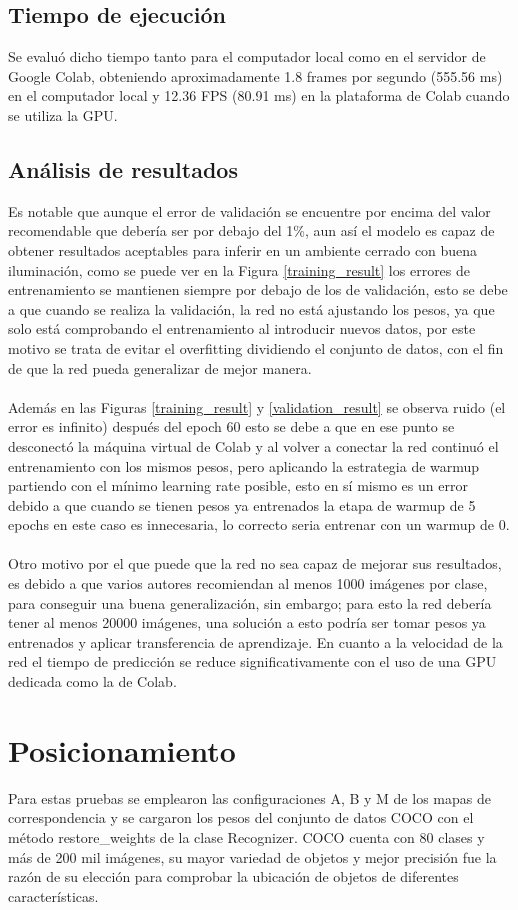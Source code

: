 \subsection{Tiempo de ejecución}
Se evaluó dicho tiempo tanto para el computador local como en el servidor de Google Colab, obteniendo aproximadamente 1.8 frames por segundo (555.56 ms) en el computador local y 12.36 FPS (80.91 ms) en la plataforma de Colab cuando se utiliza la GPU.
\subsection{Análisis de resultados}
Es notable que aunque el error de validación se encuentre por encima del valor recomendable que debería ser por debajo del 1\%, aun así el modelo es capaz de obtener resultados aceptables para inferir en un ambiente cerrado con buena iluminación, como se puede ver en la Figura \ref{training_result} los errores de entrenamiento se mantienen siempre por debajo de los de validación, esto se debe a que cuando se realiza la validación, la red no está ajustando los pesos, ya que solo está comprobando el entrenamiento al introducir nuevos datos, por este motivo se trata de evitar el overfitting dividiendo el conjunto de datos, con el fin de que la red pueda generalizar de mejor manera.
\\
\\
Además en las Figuras \ref{training_result} y \ref{validation_result} se observa ruido (el error es infinito) después del epoch 60 esto se debe a que en ese punto se desconectó la máquina virtual de Colab y al volver a conectar la red continuó el entrenamiento con los mismos pesos, pero aplicando la estrategia de warmup partiendo con el mínimo learning rate posible, esto en sí mismo es un error debido a que cuando se tienen pesos ya entrenados la etapa de warmup de 5 epochs en este caso es innecesaria, lo correcto seria entrenar con un warmup de 0.
\\
\\
Otro motivo por el que puede que la red no sea capaz de mejorar sus resultados, es debido a que varios autores recomiendan al menos 1000 imágenes por clase, para conseguir una buena generalización, sin embargo; para esto la red debería tener al menos 20000 imágenes, una solución a esto podría ser tomar pesos ya entrenados y aplicar transferencia de aprendizaje. En cuanto a la velocidad de la red el tiempo de predicción se reduce significativamente con el uso de una GPU dedicada como la de Colab.
\section{Posicionamiento}
Para estas pruebas se emplearon las configuraciones A, B y M de los mapas de correspondencia y se cargaron los pesos del conjunto de datos COCO con el método restore\_weights de la clase Recognizer. COCO cuenta con 80 clases y más de 200 mil imágenes, su mayor variedad de objetos y mejor precisión fue la razón de su elección para comprobar la ubicación de objetos de diferentes características.
